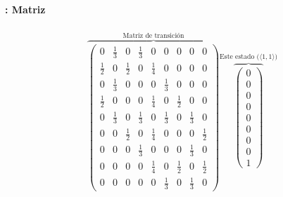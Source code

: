\documentclass{beamer}
\begin{document}
\begin{frame}
  \frametitle{\SECTIONC}
  \framesubtitle{\EJC: Matriz}

  \begin{gather*}
    \overbrace{\begin{pmatrix}
        0 & \frac{1}{3} & 0 & \frac{1}{3} & 0 & 0 & 0 & 0 & 0  \\
        \frac{1}{2} & 0 & \frac{1}{2} & 0 & \frac{1}{4} & 0 & 0 & 0 & 0  \\
        0 & \frac{1}{3} & 0 & 0 & 0 & \frac{1}{3} & 0 & 0 & 0  \\
        \frac{1}{2} & 0 & 0 & 0 & \frac{1}{4} & 0 & \frac{1}{2} & 0 & 0  \\
        0 & \frac{1}{3} & 0 & \frac{1}{3} & 0 & \frac{1}{3} & 0 & \frac{1}{3} & 0  \\
        0 & 0 & \frac{1}{2} & 0 & \frac{1}{4} & 0 & 0 & 0 & \frac{1}{2} \\
        0 & 0 & 0 & \frac{1}{3} & 0 & 0 & 0 & \frac{1}{3} & 0  \\
        0 & 0 & 0 & 0 & \frac{1}{4} & 0 & \frac{1}{2} & 0 & \frac{1}{2} \\
        0 & 0 & 0 & 0 & 0 & \frac{1}{3} & 0 & \frac{1}{3} & 0
    \end{pmatrix}}^{\text{Matriz de transición}}
    \overbrace{\begin{pmatrix}
      0 \\ 0 \\ 0 \\ 0 \\ 0 \\ 0 \\ 0 \\ 0 \\ 1 
    \end{pmatrix}}^{\text{Este estado (\(\langle 1, 1 \rangle\))}}
  \end{gather*}
\end{frame}
\end{document}
